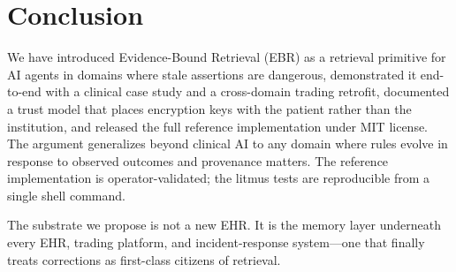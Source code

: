 \documentclass[runningheads]{llncs}
\begin{document}
\section{Conclusion}
\label{sec:conclusion}

We have introduced Evidence-Bound Retrieval (EBR) as a retrieval primitive for AI
agents in domains where stale assertions are dangerous, demonstrated it
end-to-end with a clinical case study and a cross-domain trading retrofit,
documented a trust model that places encryption keys with the patient
rather than the institution, and released the full reference implementation
under MIT license. The argument generalizes beyond clinical AI to any
domain where rules evolve in response to observed outcomes and provenance
matters. The reference implementation is operator-validated; the litmus
tests are reproducible from a single shell command.

The substrate we propose is not a new EHR. It is the memory layer underneath
every EHR, trading platform, and incident-response system---one that finally
treats corrections as first-class citizens of retrieval.



\end{document}
